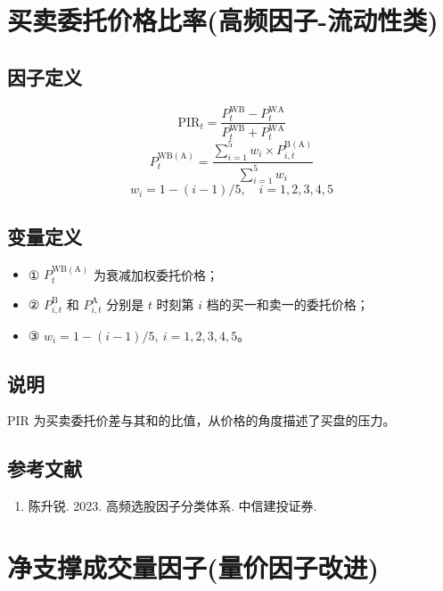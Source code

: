 \documentclass{article}
\begin{document}
\section{买卖委托价格比率(高频因子-流动性类)}

\subsection{因子定义}
\begin{equation}
    \mathrm{PIR}_t = \frac{P_t^{\mathrm{WB}} - P_t^{\mathrm{WA}}}{P_t^{\mathrm{WB}} + P_t^{\mathrm{WA}}}
\end{equation}
\begin{equation}
    P_t^{\mathrm{WB(A)}} = \frac{\sum_{i=1}^{5} w_i \times P_{i,t}^{\mathrm{B(A)}}}{\sum_{i=1}^{5} w_i}
\end{equation}
\begin{equation}
    w_i = 1 - (i - 1)/5, \quad i = 1, 2, 3, 4, 5
\end{equation}

\subsection{变量定义}
\begin{itemize}
    \item ① \( P_t^{\mathrm{WB(A)}} \) 为衰减加权委托价格；
    \item ② \( P_{i,t}^{\mathrm{B}} \) 和 \( P_{i,t}^{\mathrm{A}} \) 分别是 \( t \) 时刻第 \( i \) 档的买一和卖一的委托价格；
    \item ③ \( w_i = 1 - (i - 1)/5, \ i = 1, 2, 3, 4, 5 \)。
\end{itemize}

\subsection{说明}
PIR 为买卖委托价差与其和的比值，从价格的角度描述了买盘的压力。

\subsection{参考文献}
\begin{enumerate}
    \item 陈升锐. 2023. 高频选股因子分类体系. 中信建投证券.
\end{enumerate}


\section{净支撑成交量因子(量价因子改进)}
\end{document}
